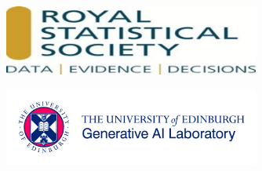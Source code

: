 \documentclass[
  letterpaper,
  DIV=11,
  numbers=noendperiod]{scrartcl}
\begin{document}
\begin{figure}

\begin{minipage}[t]{0.50\linewidth}

{\centering 

\includegraphics[width=0.75\textwidth,height=\textheight]{./images/RSS.png}\\

}

\end{minipage}%
%
\begin{minipage}[t]{0.50\linewidth}

{\centering 

\includegraphics[width=0.75\textwidth,height=\textheight]{./images/GAIL_logo.jpg}\\

}

\end{minipage}%

\end{figure}
\end{document}
